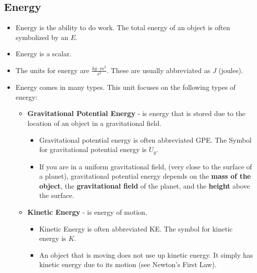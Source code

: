 \documentclass[letterpaper, 12pt]{article}
\begin{document}
\subsection*{Energy}
\begin{itemize}
	\item Energy is the ability to do work.  The total energy of an object is often symbolized by an $E$. 
	\item Energy is a scalar. 
	\item The units for energy are $ \frac{kg \cdot m^2}{s^2}$.  These are usually abbreviated as $J$ (joules). 
	\item Energy comes in many types.  This unit focuses on the following types of energy:
	\begin{itemize}
		\item \textbf{Gravitational Potential Energy} - is energy that is stored due to the location of an object in a gravitational field. 
		\begin{itemize}
			\item Gravitational potential energy is often abbreviated GPE.  The Symbol for gravitational potential energy is $U_g$.
			\item If you are in a uniform gravitational field, (very close to the surface of a planet), gravitational potential energy depends on the \textbf{mass of the object}, the \textbf{gravitational field} of the planet, and the \textbf{height} above the surface.  
		\end{itemize}
		
		\item \textbf{Kinetic Energy} - is energy of motion.
		\begin{itemize}
			\item Kinetic Energy is often abbreviated KE.  The symbol for kinetic energy is $K$.  
			\item An object that is moving does not use up kinetic energy.  It simply has kinetic energy due to its motion (see Newton's First Law).
		\end{itemize}
	\end{itemize}
	

	
	
\end{itemize}

	
\end{document}
